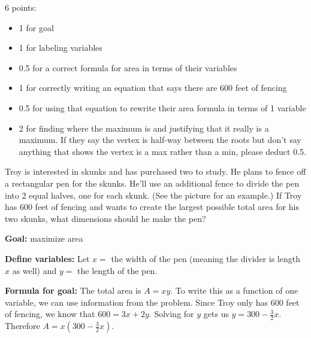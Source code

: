 \documentclass{article}
\begin{document}
\begin{enumerate}
  \begin{grading}
    6 points:
    \begin{itemize}[nosep]
    \item 1 for goal
    \item 1 for labeling variables
    \item 0.5 for a correct formula for area in terms of their variables
    \item 1 for correctly writing an equation that says there are 600 feet of fencing
    \item 0.5 for using that equation to rewrite their area formula in terms of 1 variable
    \item 2 for finding where the maximum is and justifying that it really is a maximum. If they say the vertex is half-way between the roots but don't say anything that shows the vertex is a max rather than a min, please deduct 0.5. 
    \end{itemize}
  \end{grading}

  \begin{problem}[\vfill]    
    Troy is interested in skunks and has purchased two to study. He plans to fence off a rectangular pen for the skunks. He'll use an additional fence to divide the pen into 2 equal halves, one for each skunk. (See the picture for an example.) If Troy has 600 feet of fencing and wants to create the largest possible total area for his two skunks, what dimensions should he make the pen?

  \end{problem}

  \begin{solution}
  
    \textbf{Goal:} maximize area
    
    \textbf{Define variables:}
    Let $x =$ the width of the pen (meaning the divider is length $x$ as well) and $y =$ the length of the
    pen.
    
    \textbf{Formula for goal:} The total area is $A=xy$. To write this
    as a function of one variable, we can use information from the problem.
    Since Troy only has 600 feet of fencing, we know that $600 = 3x +2y$. Solving for $y$ gets us $y = 300-\frac{3}{2}x$. Therefore
    $A=x(300-\frac{3}{2}x)$.


\end{solution}
\end{enumerate}
\end{document}
